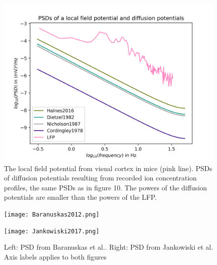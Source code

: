 \documentclass{uiophd}
\begin{document}
\begin{figure}
  \centering
  \includegraphics[width=\linewidth,height=0.6\textheight,keepaspectratio]{PSD_Gratiy.png}
  \caption{The local field potential from visual cortex in mice (pink line). PSDs of diffusion potentials resulting from recorded ion concentration profiles, the same PSDs as in figure 10. The powers of the diffusion potentials are smaller than the powers of the LFP.}
  \label{fig:PSD_Gratiy}
\end{figure}


\begin{figure}
 \centering
   \begin{minipage}[b]{0.475\textwidth}
    \texttt{[image: Baranuskas2012.png]}
  \end{minipage}
  \hfill
  \begin{minipage}[b]{0.475\textwidth}
    \texttt{[image: Jankowiski2017.png]}
  \end{minipage}
  \caption{Left: PSD from Baranuskas et al..\cite{Baranauskas2011} Right: PSD from Jankowiski et al.\cite{Jankowski2017} Axis labels applies to both figures}
  \label{fig:PSD_of_LFP}
\end{figure}
\end{document}
